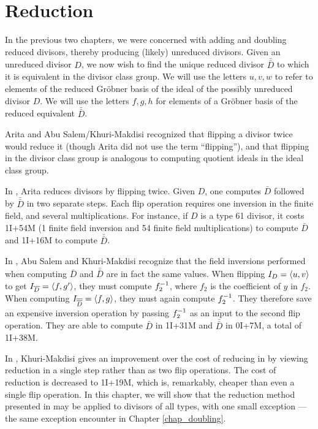 
\section{Reduction}
\label{chap_reduction}

In the previous two chapters, we were concerned with adding and doubling reduced divisors,
thereby producing (likely) unreduced divisors.
Given an unreduced divisor $D$, we now wish to find the unique reduced divisor $\bar{\bar D}$ to which 
it is equivalent in the divisor class group.
We will use the letters $u,v,w$ to refer to elements of the reduced Gr\"obner basis
of the ideal of the possibly unreduced divisor $D$.
We will use the letters $f,g,h$ for elements of a Gr\"obner basis of the reduced equivalent $\bar{\bar D}$.

Arita and Abu Salem/Khuri-Makdisi recognized that
flipping a divisor twice would reduce it (though Arita did not use the term ``flipping''),
and that flipping in the divisor class group is analogous to computing quotient ideals in the ideal class group.

In \cite{arita05-2}, Arita reduces divisors by flipping twice.
Given $D$, one computes $\bar D$ followed by $\bar{\bar D}$ in two separate steps.
Each flip operation requires one inversion in the finite field, and several multiplications.
For instance, if $D$ is a type 61 divisor,
it costs 1I+54M (1 finite field inversion and 54 finite field multiplications)
to compute $\bar D$ and 1I+16M to compute $\bar{\bar D}$.

In \cite{salem07}, Abu Salem and Khuri-Makdisi recognize that the field inversions performed
when computing $\bar D$ and $\bar{\bar D}$ are in fact the same values.
When flipping $I_D = \left\langle u,v \right\rangle$ to get $I_{\overline D} = \left\langle f,g' \right\rangle$, they must compute $f_2^{-1}$,
where $f_2$ is the coefficient of $y$ in $f_2$.
When computing $I_{\overline{\overline D}} = \left\langle f,g \right\rangle$, they must again compute $f_2^{-1}$.
They therefore save an expensive inversion operation by passing $f_2^{-1}$ as an input to the second flip operation.
They are able to compute $\bar D$ in 1I+31M and $\bar{\bar D}$ in 0I+7M, a total of 1I+38M.

In \cite{kmakdisi18}, Khuri-Makdisi gives an improvement over the cost of reducing in \cite{salem07}
by viewing reduction in a single step rather than as two flip operations.
The cost of reduction is decreased to 1I+19M, which is, remarkably, cheaper than even a single flip operation.
In this chapter, we will show that the reduction method presented in \cite{kmakdisi18}
may be applied to divisors of all types, with one small exception ---
the same exception encounter in Chapter \ref{chap_doubling}.

